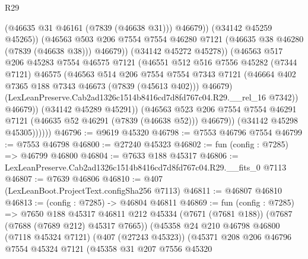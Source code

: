 \begin{lexlean}{R29}
\begin{coremodule}
                              (@46635 @31 @46161 (@7839 (@46638 @31)))
                              @46679))
                          (@34142 @45259 @45265))
                        (@46563
                          @503
                          @206
                          @7554
                          @7554
                          @46280
                          @7121
                          (@46635 @38 @46280 (@7839 (@46638 @38)))
                          @46679))
                      (@34142 @45272 @45278))
                    (@46563
                      @517
                      @206
                      @45283
                      @7554
                      @46575
                      @7121
                      (@46551
                        @512
                        @516
                        @7556
                        @45282
                        (@7344 @7121)
                        @46575
                        (@46563
                          @514
                          @206
                          @7554
                          @7554
                          @7343
                          @7121
                          (@46664 @402 @7365 @188 @7343 @46673 (@7839 (@45613 @402)))
                          @46679)
                        (LexLeanPreserve.Cab2ad1326c1514b8416cd7d8fd767c04.R29.__rel_16 @7342))
                      @46679))
                  (@34142 @45289 @45291))
                (@46563
                  @523
                  @206
                  @7554
                  @7554
                  @46291
                  @7121
                  (@46635 @52 @46291 (@7839 (@46638 @52)))
                  @46679))
              (@34142 @45298 @45305))))))
@46796 := @9619 @45320
@46798 := @7553 @46796 @7554
@46799 := @7553 @46798
@46800 := @27240 @45323
@46802 := fun (config : @7285) => @46799 @46800
@46804 := @7633 @188 @45317
@46806 := LexLeanPreserve.Cab2ad1326c1514b8416cd7d8fd767c04.R29.__fits_0 @7113
@46807 := @7639 @46806
@46810 := @407 (LexLeanBoot.ProjectText.configSha256 @7113)
@46811 := @46807 @46810
@46813 := (config : @7285) -> @46804 @46811
@46869 := fun (config : @7285) =>
  @7650
    @188
    @45317
    @46811
    @212
    @45334
    (@7671 (@7681 @188))
    (@7687 (@7688 (@7689 @212) @45317 @7665))
    (@45358
      @24
      @210
      @46798
      @46800
      (@7118 @45324 @7121)
      (@407 (@27243 @45323))
      (@45371
        @208
        @206
        @46796
        @7554
        @45324
        @7121
        (@45358
          @31
          @207
          @7556
          @45320

\end{coremodule}
\end{lexlean}
